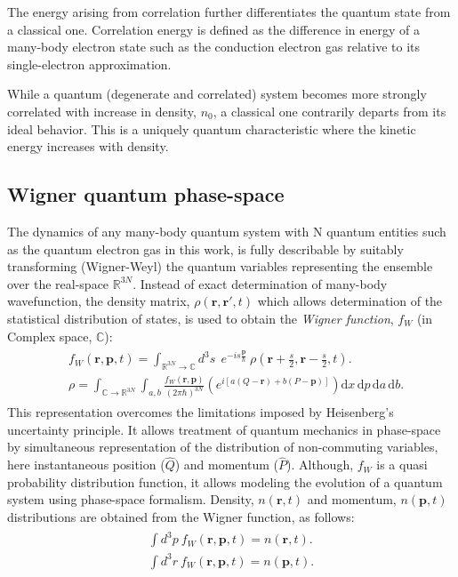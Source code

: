 \documentclass[aps,twocolumn,notitlepage,superscriptaddress]{revtex4-1}
\renewcommand\vec{\mathbf}
\begin{document}
The energy arising from correlation further differentiates the quantum state from a classical one. Correlation energy is defined as the difference in energy of a many-body electron state such as the conduction electron gas relative to its single-electron approximation.

While a quantum (degenerate and correlated) system becomes more strongly correlated with increase in density, $n_0$, a classical one contrarily departs from its ideal behavior. This is a uniquely quantum characteristic where the kinetic energy increases with density. 

\subsection{Wigner quantum phase-space} 
The dynamics of any many-body quantum system with N quantum entities such as the quantum electron gas in this work, is fully describable by suitably transforming (Wigner-Weyl) the quantum variables representing the ensemble over the real-space $\mathbb{R}^{3N}$. Instead of exact determination of many-body wavefunction, the density matrix, $\rho(\vec{r},\vec{r'},t)$ which allows determination of the statistical distribution of states, is used to obtain the {\em Wigner function}, $f_W$ (in Complex space, $\mathbb{C}$):
\begin{align}\label{eq:Wigner-Weyl-transform}
\begin{split} 
& f_W(\vec{r},\vec{p},t) = \int_{\mathbb{R}^{3N}\rightarrow\mathbb{C}} d^3s~~e^{-is\frac{\vec{p}}{\hbar}}~ \rho\left(\vec{r}+\frac{s}{2}, \vec{r}-\frac{s}{2}, t\right). \\
& \rho = \int_{\mathbb{C}\rightarrow\mathbb{R}^{3N}}\int_{a,b} \frac{f_W(\vec{r},\vec{p})}{(2\pi\hbar)^{3N}} \left(e^{i[a(Q-\vec{r})+b(P-\vec{p})]}\right) \text{d}x\, \text{d}p\, \text{d}a\, \text{d}b.
\end{split}
\end{align}
This representation overcomes the limitations imposed by Heisenberg's uncertainty principle. It allows treatment of quantum mechanics in phase-space by simultaneous representation of the distribution of non-commuting variables, here instantaneous position ($\hat{Q}$) and momentum ($\hat{P}$). Although, $f_W$ is a quasi probability distribution function, it allows modeling the evolution of a quantum system using phase-space formalism. Density, $n(\vec{r},t)$ and momentum, $n(\vec{p},t)$ distributions are obtained from the Wigner function, as follows:
 \begin{align}\label{eq:density-momentum-distribution}
\begin{split} 
\int d^3p ~ f_W(\vec{r}, \vec{p}, t) = n(\vec{r}, t).\\
\int d^3r ~ f_W(\vec{r}, \vec{p}, t) = n(\vec{p}, t).
\end{split}
\end{align}
\end{document}
